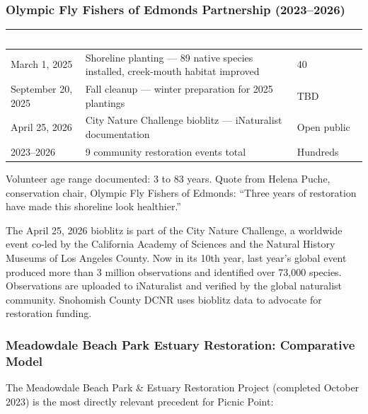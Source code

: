 \documentclass[11pt,letterpaper]{article}
\newcommand{\tableheader}[1]{\textbf{\sffamily\textcolor{white}{#1}}}
\begin{document}
\subsubsection{Olympic Fly Fishers of Edmonds Partnership (2023--2026)}

\begin{center}
\begin{tabularx}{\textwidth}{L{2.5cm}XC{2cm}}
\toprule
{}
\tableheader{Date} & \tableheader{Event} & \tableheader{Participants} \\
\midrule
March 1, 2025 & Shoreline planting --- 89 native species installed, creek-mouth habitat improved & 40 \\
September 20, 2025 & Fall cleanup --- winter preparation for 2025 plantings & TBD \\
April 25, 2026 & City Nature Challenge bioblitz --- iNaturalist documentation & Open public \\
2023--2026 & 9 community restoration events total & Hundreds \\
\bottomrule
\end{tabularx}
\end{center}

Volunteer age range documented: 3 to 83 years. Quote from Helena Puche, conservation chair, Olympic Fly Fishers of Edmonds: ``Three years of restoration have made this shoreline look healthier.''

The April 25, 2026 bioblitz is part of the City Nature Challenge, a worldwide event co-led by the California Academy of Sciences and the Natural History Museums of Los Angeles County. Now in its 10th year, last year's global event produced more than 3 million observations and identified over 73,000 species. Observations are uploaded to iNaturalist and verified by the global naturalist community. Snohomish County DCNR uses bioblitz data to advocate for restoration funding.

\subsubsection{Meadowdale Beach Park Estuary Restoration: Comparative Model}

The Meadowdale Beach Park \& Estuary Restoration Project (completed October 2023) is the most directly relevant precedent for Picnic Point:
\end{document}
